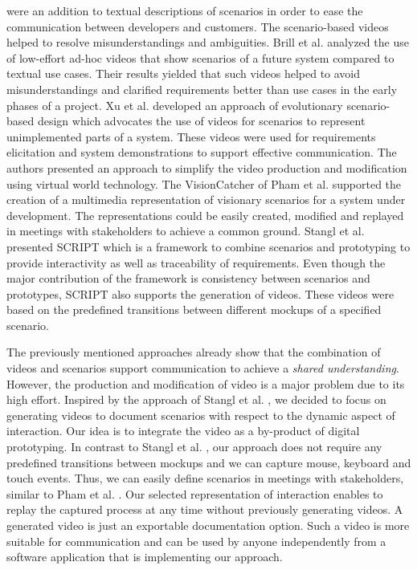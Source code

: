 \documentclass[conference]{IEEEtran}
\begin{document}
were an addition to textual descriptions of scenarios in order to ease the 
communication between developers and customers. The scenario-based videos 
helped to resolve misunderstandings and ambiguities.
Brill et al. \cite{Brill.2010} analyzed the use of low-effort ad-hoc videos 
that show scenarios of a future system compared to textual use cases. Their 
results yielded that such videos helped to avoid misunderstandings and 
clarified requirements better than use cases in the early phases of a project.
Xu et al. \cite{Xu.2012} developed an approach of evolutionary scenario-based 
design which advocates the use of videos for scenarios to represent 
unimplemented parts of a system. These videos were used for requirements 
elicitation and system demonstrations to support effective communication. The 
authors presented an approach to simplify the video production and modification 
using virtual world technology.
The VisionCatcher of Pham et al. \cite{Pham.2012} supported the creation of a 
multimedia representation of visionary scenarios for a system under 
development. The representations could be easily created, modified and replayed 
in meetings with stakeholders to achieve a common ground.
Stangl et al. \cite{Stangl.2011, Stangl.2012} presented SCRIPT which is a 
framework to combine scenarios and prototyping to provide interactivity as well 
as traceability of requirements. Even though the major contribution of the 
framework is consistency between scenarios and prototypes, SCRIPT also supports 
the generation of videos. These videos were based on the predefined transitions 
between different mockups of a specified scenario.

The previously mentioned approaches already show that the combination of 
videos and scenarios support communication to achieve a \textit{shared 
understanding}. However, the production and modification of video is a major 
problem due to its high effort. Inspired by the approach of Stangl et al.
\cite{Stangl.2011,Stangl.2012}, we decided to focus on generating videos to 
document scenarios with respect to the dynamic aspect of interaction. Our idea 
is to integrate the video as a by-product of digital prototyping. In contrast 
to Stangl et al. \cite{Stangl.2011,Stangl.2012}, our approach does not require 
any predefined transitions between mockups and we can capture mouse, keyboard 
and touch events. Thus, we can easily define scenarios in meetings with 
stakeholders, similar to Pham et al. \cite{Pham.2012}. Our selected 
representation of interaction enables to replay the captured process at any 
time without previously generating videos. A generated video is just an 
exportable documentation option. Such a video is more suitable for 
communication and can be used by anyone independently from a software 
application that is implementing our approach.
\end{document}
